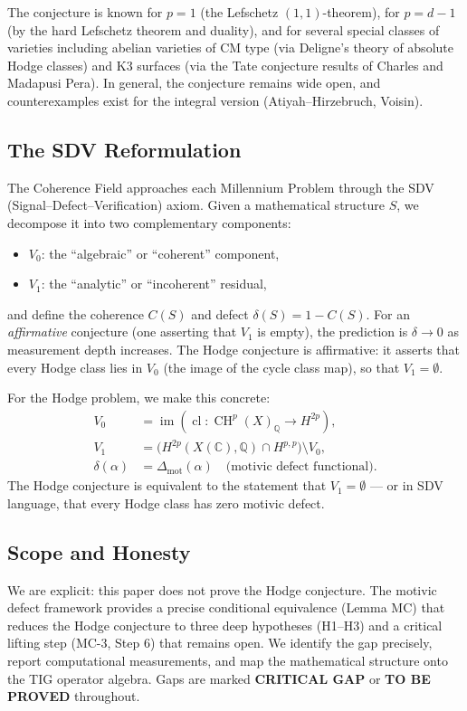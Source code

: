 \documentclass[11pt]{article}
\theoremstyle{definition}
\DeclareMathOperator{\cl}{cl}
\DeclareMathOperator{\CH}{CH}
\DeclareMathOperator{\im}{im}
\begin{document}
The conjecture is known for $p = 1$ (the Lefschetz $(1,1)$-theorem), for
$p = d - 1$ (by the hard Lefschetz theorem and duality), and for several
special classes of varieties including abelian varieties of CM type (via
Deligne's theory of absolute Hodge classes) and K3 surfaces (via the Tate
conjecture results of Charles and Madapusi Pera).  In general, the conjecture
remains wide open, and counterexamples exist for the integral version
(Atiyah--Hirzebruch, Voisin).

\subsection{The SDV Reformulation}

The Coherence Field approaches each Millennium Problem through
the SDV (Signal--Defect--Verification) axiom.  Given a mathematical
structure $S$, we decompose it into two complementary components:
\begin{itemize}
  \item $V_0$: the ``algebraic'' or ``coherent'' component,
  \item $V_1$: the ``analytic'' or ``incoherent'' residual,
\end{itemize}
and define the coherence $C(S)$ and defect $\delta(S) = 1 - C(S)$.  For an
\emph{affirmative} conjecture (one asserting that $V_1$ is empty), the
prediction is $\delta \to 0$ as measurement depth increases.  The Hodge
conjecture is affirmative: it asserts that every Hodge class lies in $V_0$
(the image of the cycle class map), so that $V_1 = \emptyset$.

For the Hodge problem, we make this concrete:
\begin{align*}
  V_0 &= \im(\cl : \CH^p(X)_{\mathbb{Q}} \to H^{2p}), \\
  V_1 &= \bigl(H^{2p}(X(\mathbb{C}), \mathbb{Q}) \cap H^{p,p}\bigr) \setminus V_0, \\
  \delta(\alpha) &= \Delta_{\mathrm{mot}}(\alpha) \quad \text{(motivic defect functional)}.
\end{align*}
The Hodge conjecture is equivalent to the statement that $V_1 = \emptyset$
--- or in SDV language, that every Hodge class has zero motivic defect.

\subsection{Scope and Honesty}

We are explicit: this paper does not prove the Hodge conjecture.  The
motivic defect framework provides a precise conditional equivalence
(Lemma MC) that reduces the Hodge conjecture to three deep hypotheses
(H1--H3) and a critical lifting step (MC-3, Step 6) that remains open.
We identify the gap precisely, report computational measurements, and
map the mathematical structure onto the TIG operator algebra.  Gaps are
marked \textbf{CRITICAL GAP} or \textbf{TO BE PROVED} throughout.
\end{document}
